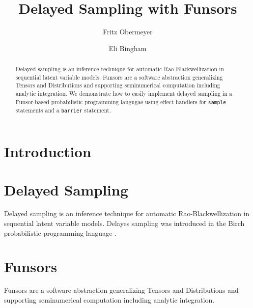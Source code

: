 \documentclass[anonymous=false, %
               format=acmsmall, %
               review=true, %
               screen=true, %
               nonacm=true]{acmart}
\begin{document}
\title{Delayed Sampling with Funsors}

\author{Fritz Obermeyer}

\author{Eli Bingham}

\begin{abstract}
Delayed sampling is an inference technique for automatic Rao-Blackwellization in sequential latent variable models.
Funsors are a software abstraction generalizing Tensors and Distributions and supporting seminumerical computation including analytic integration.
We demonstrate how to easily implement delayed sampling in a Funsor-based probabilistic programming langugae using effect handlers for \texttt{sample} statements and a \texttt{barrier} statement.
\end{abstract}

\maketitle

\section{Introduction}

\section{Delayed Sampling}

Delayed sampling \cite{murray2017delayed} is an inference technique for automatic Rao-Blackwellization in sequential latent variable models.
Delayes sampling was introduced in the Birch probabilistic programming language \cite{murray2018automated}.

\section{Funsors}

Funsors \cite{obermeyer2019functional} are a software abstraction generalizing Tensors and Distributions and supporting seminumerical computation including analytic integration.
\end{document}

